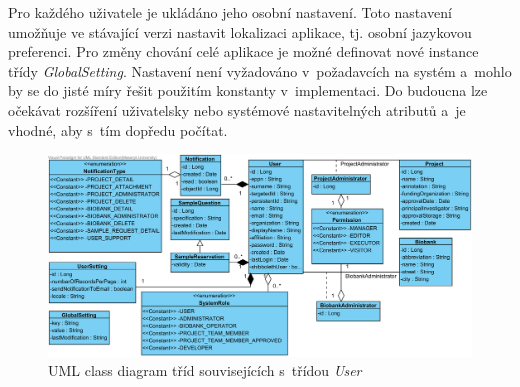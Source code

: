 \documentclass[11pt, draft, oneside]{fithesis2}
\begin{document}
Pro každého uživatele je ukládáno jeho osobní nastavení. Toto nastavení umožňuje ve stávající verzi nastavit lokalizaci aplikace, tj. osobní jazykovou preferenci. Pro změny chování celé aplikace je možné definovat nové instance třídy \textit{GlobalSetting}. Nastavení není vyžadováno v~požadavcích na systém a~mohlo by se do jisté míry řešit použitím konstanty v~implementaci. Do budoucna lze očekávat rozšíření uživatelsky nebo systémové nastavitelných atributů a~je vhodné, aby s~tím dopředu počítat.

\begin{figure}[h!]
\begin{center}
	\includegraphics[width=\textwidth]{UserView}
\caption{UML class diagram tříd souvisejících s~třídou \textit{User}}
\label{fig:index:uml:class:user}
\end{center}
\end{figure}

\end{document}
